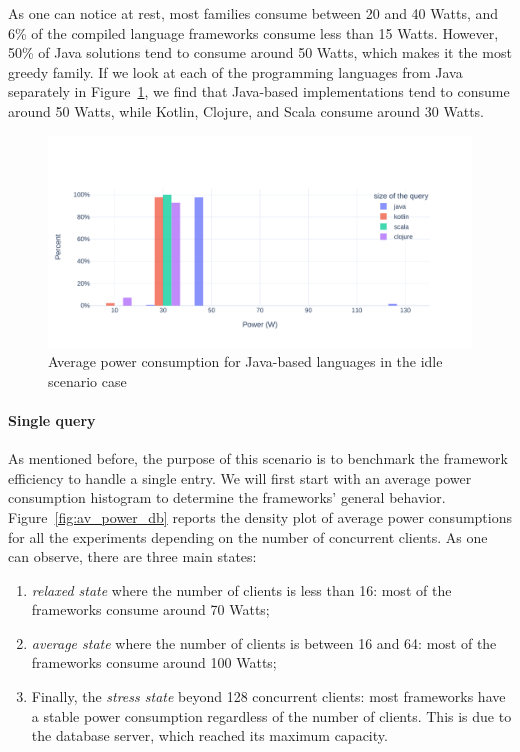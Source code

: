 As one can notice at rest, most families consume between 20 and 40 Watts, and 6\% of the compiled language frameworks consume less than 15 Watts.
However, 50\% of Java solutions tend to consume around 50 Watts, which makes it the most greedy family.
If we look at each of the programming languages from Java separately in Figure~\ref{fig:av_power_java_idle}, we find that Java-based implementations tend to consume around 50 Watts, while Kotlin, Clojure, and Scala consume around 30 Watts.

\begin{figure}[bht]
    \centering
    \includegraphics[width=1.0\columnwidth]{imgs/av_power_java_idle}
    \caption{Average power consumption for Java-based languages in the idle scenario case}
    \label{fig:av_power_java_idle}
\end{figure}

\paragraph{Single query}
As mentioned before, the purpose of this scenario is to benchmark the framework efficiency to handle a single entry.
We will first start with an average power consumption histogram to determine the frameworks' general behavior.
Figure~\ref{fig:av_power_db} reports the density plot of average power consumptions for all the experiments depending on the number of concurrent clients.
As one can observe, there are three main states:
\begin{enumerate}
    \item \emph{relaxed state} where the number of clients is less than 16: most of the frameworks consume around 70 Watts;
    \item \emph{average state} where the number of clients is between 16 and 64: most of the frameworks consume around 100 Watts;
    \item Finally, the \emph{stress state} beyond 128 concurrent clients: most frameworks have a stable power consumption regardless of the number of clients.
          This is due to the database server, which reached its maximum capacity.
\end{enumerate}

